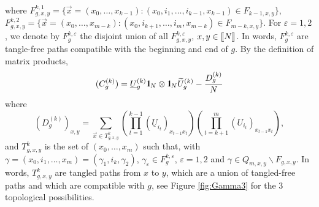 \documentclass[11pt]{article}
\newcommand{\PAR}[1]{{{\left(#1\right)}}} %
\newcommand{\1}{1\!\!{\sf I}}
\newcommand{\IND}{\1}
\newcommand{\veps}{\varepsilon}
\newcommand{\INT}[1]{{{\left[\hspace{-1.4pt}\left[#1\right]\hspace{-1.4pt}\right]}}}
\begin{document}
where $F^{k,1}_{g,x,y} = \{ \vec x = (x_0,\ldots ,x_{k-1} )  : (x_0,i_1,\ldots,i_{k-1},x_{k-1}) \in F_{k-1,x,y} \}$, ${F}^{k,2}_{g,x,y} = \{ \vec x  = (x_0,\ldots,x_{m-k}) : (x_0,i_{k+1},\ldots,i_{m},x_{m-k}) \in F_{m-k,x,y}  \}$. For $\veps = 1,2$, we denote by $F^{k,\veps}_g$ the disjoint union of all $F^{k,\veps}_{g,x,y}$, $x,y \in \INT{N}$. In words, $F_g^{k,\veps}$ are tangle-free paths compatible with the beginning and end of $g$. By the definition of matrix products, 
$$
(C^{(k)}_g) = \underline U_{g}^{(k)} \IND_N \otimes \IND_N \widetilde U_g^{(k)} - \frac {D^{(k)}_g} N 
$$
 where 
 $$
( D^{(k)}_g)_{x,y} = \sum_{\vec x  \in T^{k}_{g,x,y}}  \PAR{ \prod_{t=1}^{k-1} ( \underline U_{i_t} )_{x_{t-1} x_{t} } } \PAR{\prod_{t = k+1}^{m} ( U_{i_t} )_{x_{t-1} x_{t} }},
 $$
and $T^{k}_{g,x,y}$ is the set of $(x_0,\ldots,x_m)$ such that, with $\gamma = (x_0,i_1,\ldots,x_m) = (\gamma_1,i_k,\gamma_2)$, $\gamma_\veps \in F_g^{k,\veps}$, $\veps = 1,2$ and $\gamma \in Q_{m,x,y} \backslash F_{g,x,y}$. In words, $T_{g,x,y}^{k}$ are tangled paths from $x$ to $y$, which are a union of tangled-free paths and which are compatible with $g$, see Figure \ref{fig:Gamma3} for the $3$ topological possibilities.
\end{document}

